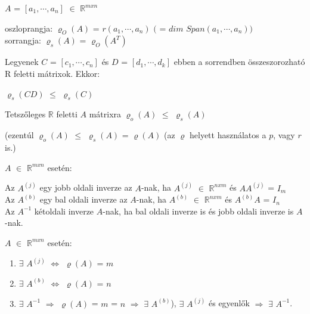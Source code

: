 	
	\begin{frame}
		\begin{tcolorbox}[title={Def.: Sorrang, Oszloprang}]
			$A$ = $[a_1, {\cdots}, a_n]$ $\in$ $\mathbb{R}^{m x n}$ \\
			\mmedskip
			
			oszloprangja: ${\varrho}_{O}(A)$ = $r(a_1, {\cdots}, a_n)$ $($ = $dim$ $Span(a_1, {\cdots}, a_n))$\\
			sorrangja: ${\varrho}_{s}(A)$ = ${\varrho}_{O}(A^T)$\\
		\end{tcolorbox}

		\begin{tcolorbox}[title={Tétel: Mátrixszorzás, dimenzió}]
			Legyenek $C$ = $[c_1, {\cdots}, c_n]$ és $D$ = $[d_1, {\cdots}, d_k]$ ebben a sorrendben összeszorozható
R feletti mátrixok. Ekkor:\\
			\mmedskip
			
	 		${\varrho}_{s}(CD)$ $\leq$ ${\varrho}_{s}(C)$
		\end{tcolorbox}
		
		\begin{tcolorbox}[title={Tétel: Mátrix, rang}]
			Tetszőleges $\mathbb{R}$ feletti $A$ mátrixra ${\varrho}_{o}(A)$ $\leq$ ${\varrho}_{s}(A)$\\
			\mmedskip
			
			(ezentúl ${\varrho}_{o}(A)$ $\leq$ ${\varrho}_{s}(A)$ = ${\varrho}(A)$ (az $\varrho$ helyett használatos a $p$, vagy $r$ is.)
		\end{tcolorbox}
		
		\begin{tcolorbox}[title={Tétel: Inverz}]
			$A$ $\in$ $\mathbb{R}^{m x n}$ esetén:\\
			\mmedskip
			
			Az $A^{(j)}$ egy jobb oldali inverze az $A$-nak, ha $A^{(j)}$ $\in$ $\mathbb{R}^{n x m}$ és $AA^{(j)}$ = $I_m$\\
			Az $A^{(b)}$ egy bal oldali inverze az $A$-nak, ha $A^{(b)}$ $\in$ $\mathbb{R}^{n x m}$ és $A^{(b)}A$ = $I_n$\\
			Az $A^{-1}$ kétoldali inverze $A$-nak, ha bal oldali inverze is és jobb oldali inverze is $A$-nak. 
		\end{tcolorbox}
		
		\begin{tcolorbox}[title={Tétel: Inverz létezése}]
			$A$ $\in$ $\mathbb{R}^{m x n}$ esetén:\\
			
			\begin{enumerate}
			\item $\exists$ $A^{(j)}$ $\iff$ ${\varrho}(A)$ = $m$
			\item $\exists$ $A^{(b)}$ $\iff$ ${\varrho}(A)$ = $n$
			\item $\exists$ $A^{-1}$ $\Rightarrow$ ${\varrho}(A)$ = $m$ = $n$ $\Rightarrow$ $\exists$ $A^{(b)}$), $\exists$ $A^{(j)}$ és egyenlők $\Rightarrow$ $\exists$ $A^{-1}$.
			\end{enumerate}
		\end{tcolorbox}
	\end{frame}
	
